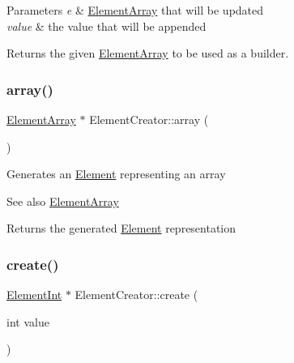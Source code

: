 \begin{DoxyParams}{Parameters}
{\em e} & \mbox{\hyperlink{classElementArray}{Element\+Array}} that will be updated \\
\hline
{\em value} & the value that will be appended \\
\hline
\end{DoxyParams}
\begin{DoxyReturn}{Returns}
the given \mbox{\hyperlink{classElementArray}{Element\+Array}} to be used as a builder. 
\end{DoxyReturn}
\mbox{\label{classElementCreator_a997d880e54dc5282f795c741117088c7}} 
\subsubsection{\texorpdfstring{array()}{array()}}
{\footnotesize\ttfamily \mbox{\hyperlink{classElementArray}{Element\+Array}} $\ast$ Element\+Creator\+::array (\begin{DoxyParamCaption}{ }\end{DoxyParamCaption})\hspace{0.3cm}{\ttfamily [static]}}

Generates an \mbox{\hyperlink{classElement}{Element}} representing an array \begin{DoxySeeAlso}{See also}
\mbox{\hyperlink{classElementArray}{Element\+Array}}
\end{DoxySeeAlso}
\begin{DoxyReturn}{Returns}
the generated \mbox{\hyperlink{classElement}{Element}} representation 
\end{DoxyReturn}
\mbox{\label{classElementCreator_a4d2ee7d169ec568eb76e41dc0baaf314}} 
\subsubsection{\texorpdfstring{create()}{create()}\hspace{0.1cm}{\footnotesize\ttfamily [1/6]}}
{\footnotesize\ttfamily \mbox{\hyperlink{classElementInt}{Element\+Int}} $\ast$ Element\+Creator\+::create (\begin{DoxyParamCaption}\item[{int}]{value }\end{DoxyParamCaption})\hspace{0.3cm}{\ttfamily [static]}}

